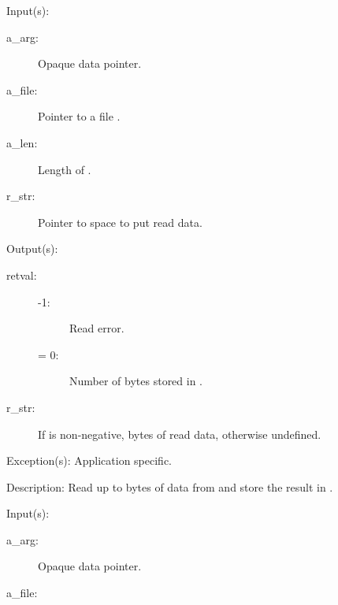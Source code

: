 \begin{capi}
\label{cw_nxo_file_read_t}
	\begin{capilist}
	\item[Input(s): ]
		\begin{description}\item[]
		\item[a\_arg: ]
			Opaque data pointer.
		\item[a\_file: ]
			Pointer to a file .
		\item[a\_len: ]
			Length of .
		\item[r\_str: ]
			Pointer to space to put read data.
		\end{description}
	\item[Output(s): ]
		\begin{description}\item[]
		\item[retval: ]
			\begin{description}\item[]
			\item[-1: ]
				Read error.
			\item[{\gt}= 0: ]
				Number of bytes stored in .
			\end{description}
		\item[r\_str: ]
			If  is non-negative,  bytes of
			read data, otherwise undefined.
		\end{description}
	\item[Exception(s): ] Application specific.
	\item[Description: ]
		Read up to  bytes of data from  and
		store the result in .
	\end{capilist}
\label{cw_nxo_file_write_t}
	\begin{capilist}
	\item[Input(s): ]
		\begin{description}\item[]
		\item[a\_arg: ]
			Opaque data pointer.
		\item[a\_file: ]

\end{description}
\end{capilist}
\end{capi}

